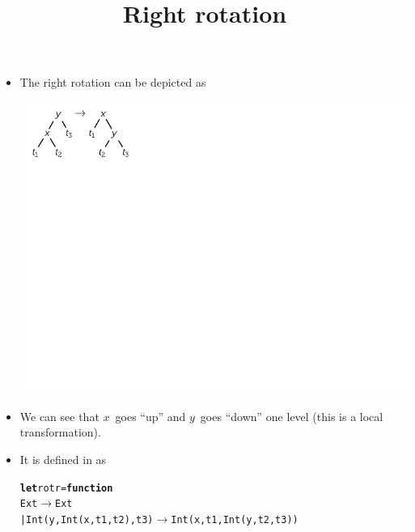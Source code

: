 \documentclass[wide]{slides}
\begin{document}
\begin{slide}
  \title{Right rotation}

  \begin{itemize}

    \item The right rotation can be depicted as
      \begin{center}
        \includegraphics[trim=5mm 73mm 7cm 0]{rotr.pdf}
      \end{center}

    \item We can see that \(x\)~goes ``up'' and \(y\)~goes ``down''
      one level (this is a local transformation).

    \item It is defined in \OCaml as
      \smallskip
\begin{alltt}
\textbf{let} rotr = \textbf{function}
  Ext \(\rightarrow\) Ext
| Int (y, Int(x,t1,t2), t3) \(\rightarrow\) Int (x, t1, Int(y,t2,t3))
\end{alltt}

  \end{itemize}

\end{slide}
\end{document}
